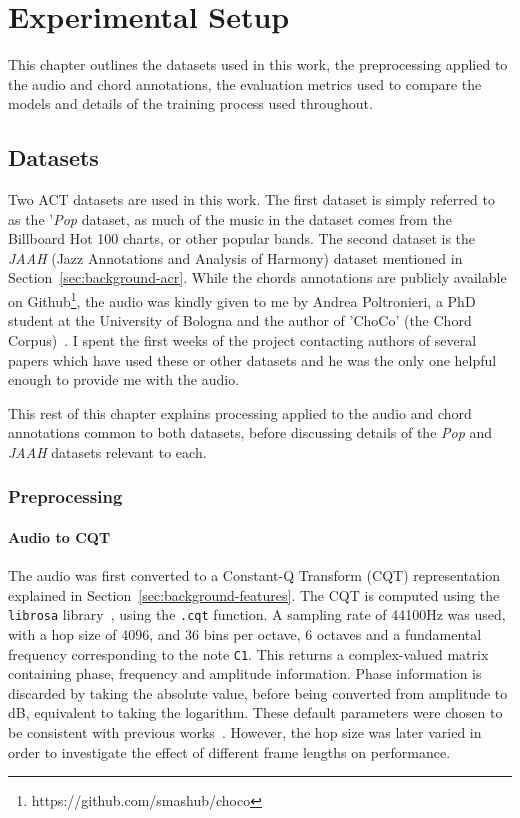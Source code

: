 \chapter{Experimental Setup}

This chapter outlines the datasets used in this work, the preprocessing applied to the audio and chord annotations, the evaluation metrics used to compare the models and details of the training process used throughout.

\section{Datasets}

Two ACT datasets are used in this work. The first dataset is simply referred to as the '\emph{Pop} dataset, as much of the music in the dataset comes from the Billboard Hot 100 charts, or other popular bands. The second dataset is the \emph{JAAH} (Jazz Annotations and Analysis of Harmony) dataset mentioned in Section~\ref{sec:background-acr}. While the chords annotations are publicly available on Github\footnote{https://github.com/smashub/choco}, the audio was kindly given to me by Andrea Poltronieri, a PhD student at the University of Bologna and the author of 'ChoCo' (the Chord Corpus)~\citep{Choco}. I spent the first weeks of the project contacting authors of several papers which have used these or other datasets and he was the only one helpful enough to provide me with the audio.

This rest of this chapter explains processing applied to the audio and chord annotations common to both datasets, before discussing details of the \emph{Pop} and \emph{JAAH} datasets relevant to each.

\subsection{Preprocessing}

\subsubsection{Audio to CQT}\label{sec:audio-to-cqt}

The audio was first converted to a Constant-Q Transform (CQT) representation explained in Section~\ref{sec:background-features}. The CQT is computed using the \texttt{librosa} library~\citep{librosa}, using the \texttt{.cqt} function. A sampling rate of 44100Hz was used, with a hop size of 4096, and 36 bins per octave, 6 octaves and a fundamental frequency corresponding to the note \texttt{C1}. This returns a complex-valued matrix containing phase, frequency and amplitude information. Phase information is discarded by taking the absolute value, before being converted from amplitude to dB, equivalent to taking the logarithm.  These default parameters were chosen to be consistent with previous works~\citep{StructuredTraining}. However, the hop size was later varied in order to investigate the effect of different frame lengths on performance.

